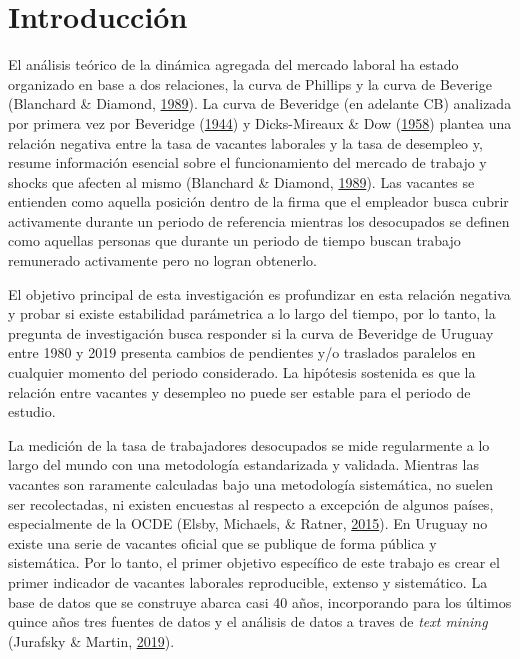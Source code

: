 \documentclass[12pt,oneside]{reedthesis}
\begin{document}
  \hypersetup{linkcolor=black}
  \setcounter{tocdepth}{2}
  \tableofcontents

  \listoftables

  \listoffigures

\mainmatter %
\pagestyle{fancyplain} %

\hypertarget{intro}{%
\chapter{Introducción}\label{intro}}

El análisis teórico de la dinámica agregada del mercado laboral ha estado organizado en base a dos relaciones, la curva de Phillips y la curva de Beverige (Blanchard \& Diamond, \protect\hyperlink{ref-Blanchard1989}{1989}). La curva de Beveridge (en adelante CB) analizada por primera vez por Beveridge (\protect\hyperlink{ref-Beveridge}{1944}) y Dicks-Mireaux \& Dow (\protect\hyperlink{ref-Dicks-Mireaux1958}{1958}) plantea una relación negativa entre la tasa de vacantes laborales y la tasa de desempleo y, resume información esencial sobre el funcionamiento del mercado de trabajo y shocks que afecten al mismo (Blanchard \& Diamond, \protect\hyperlink{ref-Blanchard1989}{1989}). Las vacantes se entienden como aquella posición dentro de la firma que el empleador busca cubrir activamente durante un periodo de referencia mientras los desocupados se definen como aquellas personas que durante un periodo de tiempo buscan trabajo remunerado activamente pero no logran obtenerlo.

El objetivo principal de esta investigación es profundizar en esta relación negativa y probar si existe estabilidad parámetrica a lo largo del tiempo, por lo tanto, la pregunta de investigación busca responder si la curva de Beveridge de Uruguay entre 1980 y 2019 presenta cambios de pendientes y/o traslados paralelos en cualquier momento del periodo considerado. La hipótesis sostenida es que la relación entre vacantes y desempleo no puede ser estable para el periodo de estudio.

La medición de la tasa de trabajadores desocupados se mide regularmente a lo largo del mundo con una metodología estandarizada y validada. Mientras las vacantes son raramente calculadas bajo una metodología sistemática, no suelen ser recolectadas, ni existen encuestas al respecto a excepción de algunos países, especialmente de la OCDE (Elsby, Michaels, \& Ratner, \protect\hyperlink{ref-Elsby2015}{2015}). En Uruguay no existe una serie de vacantes oficial que se publique de forma pública y sistemática. Por lo tanto, el primer objetivo específico de este trabajo es crear el primer indicador de vacantes laborales reproducible, extenso y sistemático. La base de datos que se construye abarca casi 40 años, incorporando para los últimos quince años tres fuentes de datos y el análisis de datos a traves de \emph{text mining} (Jurafsky \& Martin, \protect\hyperlink{ref-Jurasky2019}{2019}).
\end{document}
